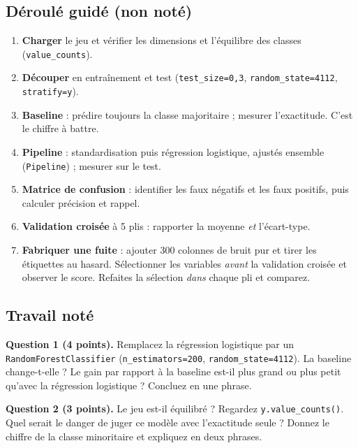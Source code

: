 \documentclass[10pt,a4paper]{article}
\begin{document}
\subsection*{Déroulé guidé (non noté)}
\begin{enumerate}
  \item \textbf{Charger} le jeu et vérifier les dimensions et l'équilibre des classes
        (\texttt{value\_counts}).
  \item \textbf{Découper} en entraînement et test (\texttt{test\_size=0{,}3},
        \texttt{random\_state=4112}, \texttt{stratify=y}).
  \item \textbf{Baseline} : prédire toujours la classe majoritaire ; mesurer
        l'exactitude. C'est le chiffre à battre.
  \item \textbf{Pipeline} : standardisation puis régression logistique, ajustés
        ensemble (\texttt{Pipeline}) ; mesurer sur le test.
  \item \textbf{Matrice de confusion} : identifier les faux négatifs et les faux
        positifs, puis calculer précision et rappel.
  \item \textbf{Validation croisée} à 5 plis : rapporter la moyenne \emph{et}
        l'écart-type.
  \item \textbf{Fabriquer une fuite} : ajouter 300 colonnes de bruit pur et tirer
        les étiquettes au hasard. Sélectionner les variables \emph{avant} la
        validation croisée et observer le score. Refaites la sélection
        \emph{dans} chaque pli et comparez.
\end{enumerate}

\subsection*{Travail noté}
\begin{bareme}
\textbf{Question 1 (4 points).}
Remplacez la régression logistique par un \texttt{RandomForestClassifier}
(\texttt{n\_estimators=200}, \texttt{random\_state=4112}).
La baseline change-t-elle ? Le gain par rapport à la baseline est-il plus grand
ou plus petit qu'avec la régression logistique ? Concluez en une phrase.
\end{bareme}

\begin{bareme}
\textbf{Question 2 (3 points).}
Le jeu est-il équilibré ? Regardez \texttt{y.value\_counts()}.
Quel serait le danger de juger ce modèle avec l'exactitude seule ? Donnez le
chiffre de la classe minoritaire et expliquez en deux phrases.
\end{bareme}
\end{document}
